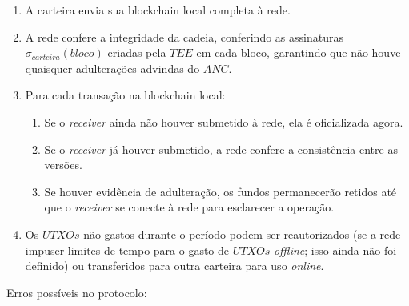 \documentclass[
  12pt,
  a4paper,
  oneside,
  article,
]{abntex2}
\begin{document}
\begin{enumerate}
	\item A carteira envia sua blockchain local completa à rede.
	\item A rede confere a integridade da cadeia, conferindo as assinaturas $\sigma_{carteira}(bloco)$ criadas pela $TEE$ em cada bloco, garantindo que não houve quaisquer adulterações advindas do $ANC$.
	\item Para cada transação na blockchain local:
	      \begin{enumerate}
		      \item Se o \textit{receiver} ainda não houver submetido à rede, ela é oficializada agora.
		      \item Se o \textit{receiver} já houver submetido, a rede confere a consistência entre as versões.
		      \item Se houver evidência de adulteração, os fundos permanecerão retidos até que o \textit{receiver} se conecte à rede para esclarecer a operação.
	      \end{enumerate}
	\item Os $UTXOs$ não gastos durante o período podem ser reautorizados (se a rede impuser limites de tempo para o gasto de $UTXOs$ \textit{offline}; isso ainda não foi definido) ou transferidos para outra carteira para uso \textit{online}.
\end{enumerate}

Erros possíveis no protocolo:
\end{document}
